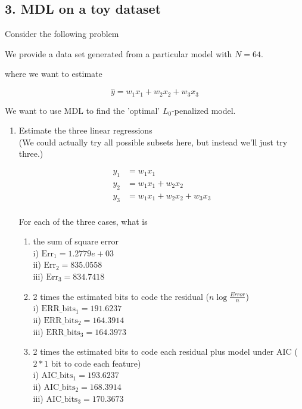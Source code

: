 \documentclass[english]{article}
\begin{document}
\subsection*{3. MDL on a toy dataset}

Consider the following problem

 We provide a data set generated from a particular model with $N=64$.

where we want to estimate

\begin{equation*}
 \hat{y} =  w_1 x_1 + w_2 x_2 + w_3 x_3 
\end{equation*}

We want to use MDL to find the 'optimal' $L_0$-penalized model.

\begin{enumerate}
\item  Estimate the three linear regressions \\

(We could actually try all possible subsets here, but instead we'll just try three.)

\begin{align*}
  y_1& = w_1 x_1 \\
  y_2& = w_1 x_1 + w_2 x_2 \\
  y_3& = w_1 x_1 + w_2 x_2 + w_3 x_3  \\
\end{align*}

For each of the three cases, what is
\begin{enumerate}
\item the sum of square error \\
i)   $\text{Err}_1 = 1.2779e+03 $ \\
ii)  $\text{Err}_2 =  835.0558$\\
iii) $\text{Err}_3 = 834.7418$\\

\item 2 times the estimated bits to code the residual ($n \log{\frac{Error}{n}} $)  \\
i)    $\text{ERR}\_\text{bits}_1 = 191.6237 $ \\
ii)   $\text{ERR}\_\text{bits}_2 = 164.3914$ \\
iii)  $\text{ERR}\_\text{bits}_3 = 164.3973$ \\

\item 2 times the estimated bits to code each residual plus model under AIC ($2*1$ bit to code each feature) \\
i)    $\text{AIC}\_\text{bits}_1 = 193.6237$ \\
ii)   $\text{AIC}\_\text{bits}_2 = 168.3914$ \\
iii)  $\text{AIC}\_\text{bits}_3 = 170.3673$ \\


\end{enumerate}
\end{enumerate}
\end{document}
